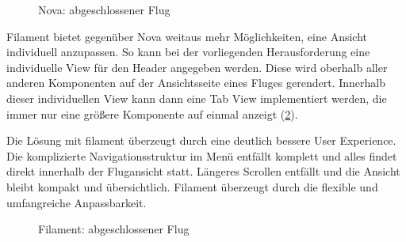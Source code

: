 \begin{figure}[h!]
    \centering
    \caption{Nova: abgeschlossener Flug}
    \label{fig:finished_flight_nova}
\end{figure}

Filament bietet gegenüber Nova weitaus mehr Möglichkeiten, eine Ansicht individuell anzupassen.
So kann bei der vorliegenden Herausforderung eine individuelle View für den Header angegeben werden.
Diese wird oberhalb aller anderen Komponenten auf der Ansichtsseite eines Fluges gerendert.
Innerhalb dieser individuellen View kann dann eine Tab View implementiert werden, die immer nur eine größere Komponente auf einmal anzeigt (\ref{fig:finished_flight_filament}).

Die Lösung mit filament überzeugt durch eine deutlich bessere User Experience.
Die komplizierte Navigationsstruktur im Menü entfällt komplett und alles findet direkt innerhalb der Flugansicht statt.
Längeres Scrollen entfällt und die Ansicht bleibt kompakt und übersichtlich.
Filament überzeugt durch die flexible und umfangreiche Anpassbarkeit.

\begin{figure}[h!]
    \centering
    \caption{Filament: abgeschlossener Flug}
    \label{fig:finished_flight_filament}
\end{figure}

